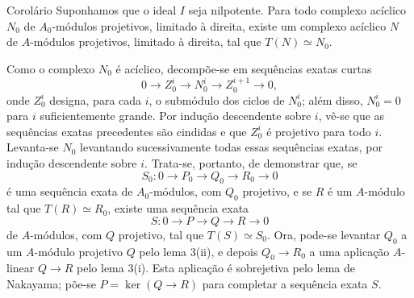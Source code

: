 \begin{statement}{Corolário}
Suponhamos que o ideal $I$ seja nilpotente. Para todo complexo acíclico $N_0$ de $A_0$-módulos projetivos, limitado à direita, existe um complexo acíclico $N$ de $A$-módulos projetivos, limitado à direita, tal que $T(N)\simeq N_0$.
\end{statement}

Como o complexo $N_0$ é acíclico, decompõe-se em sequências exatas curtas
\[
0\longrightarrow Z_0^i\longrightarrow N_0^i\longrightarrow Z_0^{i+1}\longrightarrow0,
\]
onde $Z_0^i$ designa, para cada $i$, o submódulo dos ciclos de $N_0^i$; além disso, $N_0^i=0$ para $i$ suficientemente grande. Por indução descendente sobre $i$, vê-se que as sequências exatas precedentes são cindidas e que $Z_0^i$ é projetivo para todo $i$. Levanta-se $N_0$ levantando sucessivamente todas essas sequências exatas, por indução descendente sobre $i$. Trata-se, portanto, de demonstrar que, se
\[
S_0:0\longrightarrow P_0\longrightarrow Q_0\longrightarrow R_0\longrightarrow0
\]
é uma sequência exata de $A_0$-módulos, com $Q_0$ projetivo, e se $R$ é um $A$-módulo tal que $T(R)\simeq R_0$, existe uma sequência exata
\[
S:0\longrightarrow P\longrightarrow Q\longrightarrow R\longrightarrow0
\]
de $A$-módulos, com $Q$ projetivo, tal que $T(S)\simeq S_0$. Ora, pode-se levantar $Q_0$ a um $A$-módulo projetivo $Q$ pelo lema 3(ii), e depois $Q_0\to R_0$ a uma aplicação $A$-linear $Q\to R$ pelo lema 3(i). Esta aplicação é sobrejetiva pelo lema de Nakayama; põe-se $P=\ker(Q\to R)$ para completar a sequência exata $S$.
